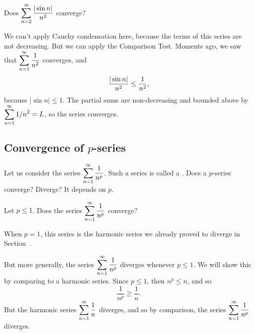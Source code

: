 \begin{example} Does $\displaystyle\sum_{n=2}^\infty {|\sin n|\over n^2}$ converge?
\end{example}

\begin{solution}
  We can't apply Cauchy condensation here, because the terms of this series
  are not decreasing.  But we can apply the Comparison Test.  Moments ago, we
  saw that $\displaystyle\sum_{n=1}^\infty \displaystyle\frac{1}{n^2}$ converges, and
$$ {|\sin n|\over n^2}\le {1\over n^2},$$
because $|\sin n|\le 1$.  The partial sums are
non-decreasing and bounded above by $\displaystyle \sum_{n=1}^\infty 1/n^2=L$, so the series
converges. 
\end{solution}
\label{example:absolute sine over n squared}

\subsection{Convergence of $p$-series}

Let us consider the series $\displaystyle\sum_{n=1}^\infty \displaystyle\frac{1}{n^p}$.  Such a series is called a .
Does a $p$-series converge?  Diverge?  It depends on $p$.

\begin{example}
Let $p \leq 1$.  Does the series $\displaystyle\sum_{n=1}^\infty \displaystyle\frac{1}{n^p}$ converge?
\end{example}

\begin{solution}
  When $p=1$, this series is the harmonic series we already proved to diverge
  in Section~. 

  But more generally, the series $\displaystyle\sum_{n=1}^\infty \displaystyle\frac{1}{n^p}$ diverges whenever
  $p \leq 1$.  We will show this by comparing to a harmonic series.
  Since $p \leq 1$, then $n^p \leq n$, and so
$$
\frac{1}{n^p} \geq \frac{1}{n}.
$$
But the harmonic series $\displaystyle\sum_{n=1}^\infty \displaystyle\frac{1}{n}$
diverges, and so by comparison, the series $\displaystyle\sum_{n=1}^\infty
\displaystyle\frac{1}{n^p}$ diverges.
\end{solution}

